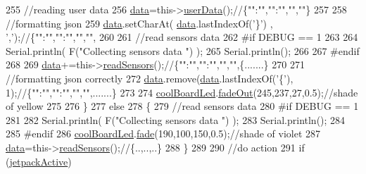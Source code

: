 \begin{DoxyCode}
255         \textcolor{comment}{//reading user data}
256         \hyperlink{classCoolBoard_a427fb753dd8575bdf821c70a5c63d695}{data}=this->\hyperlink{classCoolBoard_ae7358fb6e623cfc81b775f5f1734909b}{userData}();\textcolor{comment}{//\{"":"","":"","",""\}}
257 
258         \textcolor{comment}{//formatting json }
259         \hyperlink{classCoolBoard_a427fb753dd8575bdf821c70a5c63d695}{data}.setCharAt( \hyperlink{classCoolBoard_a427fb753dd8575bdf821c70a5c63d695}{data}.lastIndexOf(\textcolor{charliteral}{'\}'}) , \textcolor{charliteral}{','});\textcolor{comment}{//\{"":"","":"","","",}
260                 
261         \textcolor{comment}{//read sensors data}
262 \textcolor{preprocessor}{    #if DEBUG == 1}
263 
264         Serial.println( F(\textcolor{stringliteral}{"Collecting sensors data "}) );
265         Serial.println();
266     
267 \textcolor{preprocessor}{    #endif}
268 
269         \hyperlink{classCoolBoard_a427fb753dd8575bdf821c70a5c63d695}{data}+=this->\hyperlink{classCoolBoard_ad03abdce2e65f520bbf2cff0f2d083cf}{readSensors}();\textcolor{comment}{//\{"":"","":"","","",\{.......\}     }
270 
271         \textcolor{comment}{//formatting json correctly}
272         \hyperlink{classCoolBoard_a427fb753dd8575bdf821c70a5c63d695}{data}.remove(\hyperlink{classCoolBoard_a427fb753dd8575bdf821c70a5c63d695}{data}.lastIndexOf(\textcolor{charliteral}{'\{'}), 1);\textcolor{comment}{//\{"":"","":"","","",.......\}}
273         
274         \hyperlink{classCoolBoard_a1b1d3c684a5baa56b08486e192fd8e97}{coolBoardLed}.\hyperlink{classCoolBoardLed_a93d545679237e8cc858324367149775c}{fadeOut}(245,237,27,0.5);\textcolor{comment}{//shade of yellow}
275                 
276     \}   
277     \textcolor{keywordflow}{else}
278     \{
279         \textcolor{comment}{//read sensors data}
280 \textcolor{preprocessor}{    #if DEBUG == 1}
281 
282         Serial.println( F(\textcolor{stringliteral}{"Collecting sensors data "}) );
283         Serial.println();
284     
285 \textcolor{preprocessor}{    #endif}
286         \hyperlink{classCoolBoard_a1b1d3c684a5baa56b08486e192fd8e97}{coolBoardLed}.\hyperlink{classCoolBoardLed_af1cacbaa88db8bcf6042c1083ba41155}{fade}(190,100,150,0.5);\textcolor{comment}{//shade of violet        }
287         \hyperlink{classCoolBoard_a427fb753dd8575bdf821c70a5c63d695}{data}=this->\hyperlink{classCoolBoard_ad03abdce2e65f520bbf2cff0f2d083cf}{readSensors}();\textcolor{comment}{//\{..,..,..\}}
288     \}
289     
290     \textcolor{comment}{//do action}
291     \textcolor{keywordflow}{if} (\hyperlink{classCoolBoard_a9be03a913d26e558328935ca3b59a75e}{jetpackActive})

\end{DoxyCode}

